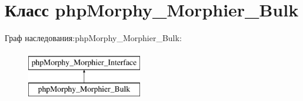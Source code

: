 \hypertarget{classphpMorphy__Morphier__Bulk}{
\section{Класс phpMorphy\_\-Morphier\_\-Bulk}
\label{classphpMorphy__Morphier__Bulk}
}
Граф наследования:phpMorphy\_\-Morphier\_\-Bulk:\begin{figure}[H]
\begin{center}
\leavevmode
\includegraphics[height=2.000000cm]{classphpMorphy__Morphier__Bulk}
\end{center}
\end{figure}
